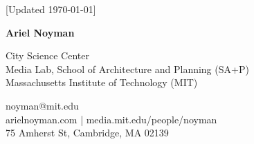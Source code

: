 \documentclass[10pt]{book}
\newcommand{\myname}{Ariel Noyman}
\begin{document}
\pagestyle{empty}
\begin{center}
    \vfill
    {[Updated \monthyeardate\today ]}
\end{center}
\vspace{2em}


\begin{flushleft}
    {\Huge\bfseries {\myname}}
\end{flushleft}

\begin{minipage}[t]{0.52\textwidth}
    \vspace{0pt}
    City Science Center\\
    Media Lab, School of Architecture and Planning (SA+P)\\
    Massachusetts Institute of Technology (MIT)
\end{minipage}%
\begin{minipage}[t]{0.48\textwidth}
    \vspace{0pt}
    \raggedleft
    noyman@mit.edu\\
    arielnoyman.com | media.mit.edu/people/noyman\\
    75 Amherst St, Cambridge, MA 02139
\end{minipage}














\end{document}

